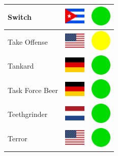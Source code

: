 \documentclass[12pt, a4paper, twoside]{report}
\begin{document}
\begin{center}
\begin{longtable}{|p{5cm}|p{2cm}|p{2cm}|}
Switch & \includegraphics[width=1cm]{4x3/cu} & \includegraphics[width=1cm]{likes/y} \\ \hline
Take Offense & \includegraphics[width=1cm]{4x3/us} & \includegraphics[width=1cm]{likes/m} \\ \hline
Tankard & \includegraphics[width=1cm]{4x3/de} & \includegraphics[width=1cm]{likes/y} \\ \hline
Task Force Beer & \includegraphics[width=1cm]{4x3/de} & \includegraphics[width=1cm]{likes/y} \\ \hline
Teethgrinder & \includegraphics[width=1cm]{4x3/nl} & \includegraphics[width=1cm]{likes/y} \\ \hline
Terror & \includegraphics[width=1cm]{4x3/us} & \includegraphics[width=1cm]{likes/y} \\ \hline

\end{longtable}
\end{center}
\end{document}
